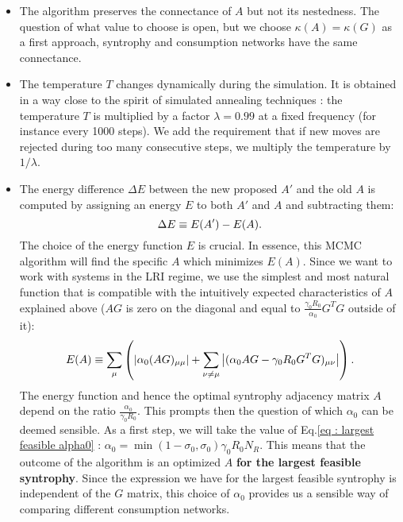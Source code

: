 \documentclass[12pt, titlepage]{report}
\begin{document}
\begin{itemize}
\item The algorithm preserves the connectance of $A$ but not its nestedness. The question of what value to choose is open, but we choose $\kappa(A)=\kappa(G)$ as a first approach, \ie syntrophy and consumption networks have the same connectance.
\item The temperature $T$ changes dynamically during the simulation. It is obtained in a way close to the spirit of simulated annealing techniques \cite{gendreau_simulated_2019} : the temperature $T$ is multiplied by a factor $\lambda=0.99$ at a fixed frequency (for instance every 1000 steps). We add the requirement that if new moves are rejected during too many consecutive steps, we multiply the temperature by $1/\lambda$.
\item The energy difference $\Delta E$ between the new proposed $A'$ and the old $A$ is computed by assigning an energy $E$ to both $A'$ and $A$ and subtracting them:
\begin{equation}
\Delta E \equiv E(A')-E(A).
\end{equation}
The choice of the energy function $E$ is crucial. In essence, this MCMC algorithm will find the specific $A$ which minimizes $E(A)$. Since we want to work with systems in the LRI regime, we use the simplest and most natural function that is compatible with the intuitively expected characteristics of $A$ explained above (\ie $AG$ is zero on the diagonal and equal to $\frac{\gamma_0 R_0}{\alpha_0} G^TG$ outside of it):
\begin{equation}
E(A) \equiv \sum_\mu \left( \left|{\alpha_0(AG)_{\mu\mu}}\right| + \sum_{\nu\neq\mu} \left|{(\alpha_0 AG-\gamma_0 R_0 G^TG)_{\mu\nu} }\right|\right).
\end{equation}
The energy function and hence the optimal syntrophy adjacency matrix $A$ depend on the ratio $\frac{\alpha_0}{\gamma_0 R_0}$. This prompts then the question of which $\alpha_0$ can be deemed sensible. As a first step, we will take the value of Eq.\eqref{eq : largest feasible alpha0} : $\alpha_0 = \min(1-\sigma_0, \sigma_0) \gamma_0 R_0 N_R$. This means that the outcome of the algorithm is an optimized $A$ \textbf{for the largest feasible syntrophy}. Since the expression we have for the largest feasible syntrophy is independent of the $G$ matrix, this choice of $\alpha_0$ provides us a sensible way of comparing different consumption networks.
\end{itemize}
\end{document}
